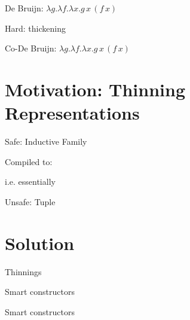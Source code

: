 \documentclass{beamer}
\begin{document}
\begin{frame}{De Bruijn: $\lambda{}g.\lambda{}f.\lambda{}x.g\,x\,(f\,x)$}


\vfill
Hard: thickening
\end{frame}

\begin{frame}{Co-De Bruijn: $\lambda{}g.\lambda{}f.\lambda{}x.g\,x\,(f\,x)$}

\end{frame}

\section{Motivation: Thinning Representations}

\begin{frame}{Safe: Inductive Family}

\vfill

Compiled to:


i.e. essentially  
\end{frame}

\begin{frame}{Unsafe: Tuple}
\end{frame}

\section{Solution}

\begin{frame}{Thinnings}

\vfill
{}

\end{frame}

\begin{frame}{Smart constructors}


\end{frame}

\begin{frame}{Smart constructors}

\end{frame}
\end{document}

